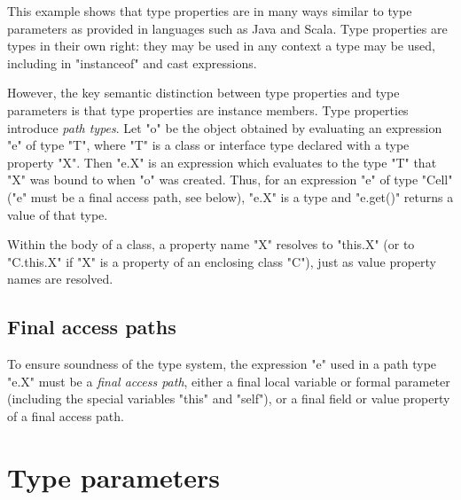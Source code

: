 This example shows that type properties are in many ways similar to
type parameters as provided in languages such as Java and Scala.
Type properties are types in their own right:
they may be used in any context a type may be used,
including in \xcd"instanceof" and cast expressions.

\label{PathTypes}

However, the key semantic distinction between type properties
and type parameters is that type properties are instance
members.
        Type properties introduce {\em path types}.
        Let \xcd"o" be the object obtained by evaluating an expression
	\xcd"e" of type \xcd"T", where 
        \xcd"T" is a class or interface type declared with
        a type property \xcd"X". Then \xcd"e.X" is an expression
	which evaluates to the type \xcd"T" that \xcd"X" was bound to when 
	\xcd"o" was created. 
Thus, for an expression \xcd"e" of type \xcd"Cell" (\xcd"e" must be a
final access path, see below), \xcd"e.X" is a type and \xcd"e.get()"
returns a value of that type.

Within the body of a class, a property name \xcd"X" resolves
to \xcd"this.X" (or to \xcd"C.this.X" if \xcd"X" is a property of
an enclosing class \xcd"C"), just as value property names are
resolved.
\fi

\iftypeparams
\else
\subsection{Final access paths}
\label{FinalAccessPath}

        To ensure soundness of the type system, the expression \xcd"e"
	used in a path type \xcd"e.X" must be a \emph{final access
	path}, either a final local variable or formal parameter
	(including the special variables \xcd"this" and \xcd"self"),
	or a final field or value property of a final access path.
\fi

\section{Type parameters}
\label{TypeParameters}


